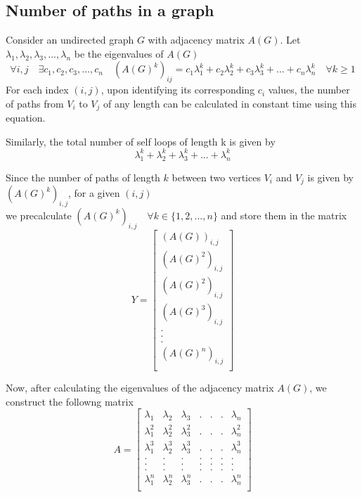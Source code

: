 \documentclass[12pt, a4paper]{article}
\begin{document}
    \subsection{Number of paths in a graph \cite{mitpaths}}
    \begin{flushleft}
    Consider an undirected graph $G$ with adjacency matrix $A(G)$. Let $\lambda_1,\lambda_2,\lambda_3,...,\lambda_n$ be the eigenvalues of $A(G)$
      $$\forall i,j \quad \exists c_1,c_2,c_3,...,c_n \quad (A(G)^k)_{ij} = c_1\lambda_1^k + c_2\lambda_2^k + c_3\lambda_3^k + ... + c_n\lambda_n^k \quad \forall k \ge 1$$
      For each index $(i, j)$, upon identifying its corresponding $c_i$ values, the number of paths from $V_i$ to $V_j$ of any length can be calculated in constant time using this equation.

      Similarly, the total number of self loops of length k is given by
      $$\lambda_1^k + \lambda_2^k + \lambda_3^k + ... + \lambda_n^k$$


      Since the number of paths of length $k$ between two vertices $V_i$ and $V_j$ is given by $(A(G)^k)_{i,j}$, for a given $(i,j)$ \\ we precalculate $(A(G)^k)_{i,j} \quad \forall k \in \{1,2,...,n\}$ and store them in the matrix
    \begin{equation*}
      Y = 
    \begin{bmatrix}
    (A(G))_{i,j} \\
    (A(G)^2)_{i,j} \\
    (A(G)^2)_{i,j} \\
    (A(G)^3)_{i,j} \\
    . \\
    . \\
    . \\
    (A(G)^{n})_{i,j} \\
    \end{bmatrix}
    \end{equation*}

    Now, after calculating the eigenvalues of the adjacency matrix $A(G)$, we construct the followng matrix
 \begin{equation*}
      A = 
    \begin{bmatrix}
      \lambda_1 & \lambda_2 & \lambda_3 & . & . & . & \lambda_n\\
      \lambda^2_1 & \lambda^2_2 & \lambda^2_3 & . & . & . & \lambda^2_n\\
      \lambda^3_1 & \lambda^3_2 & \lambda^3_3 & . & . & . & \lambda^3_n\\
      . & . & . & . & . & . & . \\
      . & . & . & . & . & . & . \\
      . & . & . & . & . & . & . \\
      \lambda^n_1 & \lambda^n_2 & \lambda^n_3 & . & . & . & \lambda^n_n\\
    \end{bmatrix}
    \end{equation*}


\end{flushleft}
\end{document}
